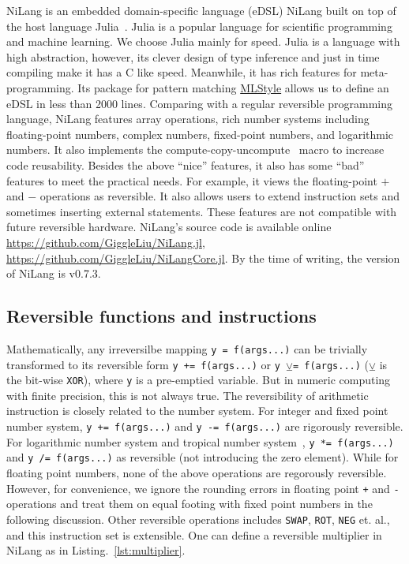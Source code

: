 \documentclass{article}
\newcommand{\<}{\langle}
\renewcommand{\>}{\rangle}
\newcommand{\Lst}[1]{Listing.~\ref{#1}}
\theoremstyle{definition}\newtheorem{definition}{\textit{Definition}}
\begin{document}
NiLang is an embedded domain-specific language (eDSL) NiLang built on top of the host language Julia~\cite{Bezanson2012,Bezanson2017}.
Julia is a popular language for scientific programming and machine learning. We choose Julia mainly for speed. Julia is a language with high abstraction, however, its clever design of type inference and just in time compiling make it has a C like speed.
Meanwhile, it has rich features for meta-programming. Its package for pattern matching \href{https://github.com/thautwarm/MLStyle.jl}{MLStyle} allows us to define an eDSL in less than 2000 lines.
Comparing with a regular reversible programming language, NiLang features array operations, rich number systems including floating-point numbers, complex numbers, fixed-point numbers, and logarithmic numbers.
It also implements the compute-copy-uncompute~\cite{Bennett1973} macro to increase code reusability.
Besides the above ``nice'' features, it also has some ``bad'' features to meet the practical needs. For example, it views the floating-point $\mathrel{+}$ and $\mathrel{-}$ operations as reversible. It also allows users to extend instruction sets and sometimes inserting external statements. These features are not compatible with future reversible hardware.
NiLang's source code is available online \href{https://github.com/GiggleLiu/NiLang.jl}{https://github.com/GiggleLiu/NiLang.jl}, \href{https://github.com/GiggleLiu/NiLangCore.jl}{https://github.com/GiggleLiu/NiLangCore.jl}.
By the time of writing, the version of NiLang is v0.7.3.

\subsection{Reversible functions and instructions}
    Mathematically, any irreversilbe mapping \texttt{y = f(args...)} can be trivially transformed to its reversible form \texttt{y += f(args...)} or \texttt{y $\veebar$= f(args...)} ($\veebar$ is the bit-wise \texttt{XOR}), where \texttt{y} is a pre-emptied variable. But in numeric computing with finite precision, this is not always true. The reversibility of arithmetic instruction is closely related to the number system.
    For integer and fixed point number system, \texttt{y += f(args...)} and \texttt{y -= f(args...)} are rigorously reversible. For logarithmic number system and tropical number system~\cite{Speyer2009}, \texttt{y *= f(args...)} and \texttt{y /= f(args...)} as reversible (not introducing the zero element). While for floating point numbers, none of the above operations are regorously reversible. However, for convenience, we ignore the rounding errors in floating point \texttt{+} and \texttt{-} operations and treat them on equal footing with fixed point numbers in the following discussion.
Other reversible operations includes \texttt{SWAP}, \texttt{ROT}, \texttt{NEG} et. al., and this instruction set is extensible.
One can define a reversible multiplier in NiLang as in \Lst{lst:multiplier}.
\end{document}

